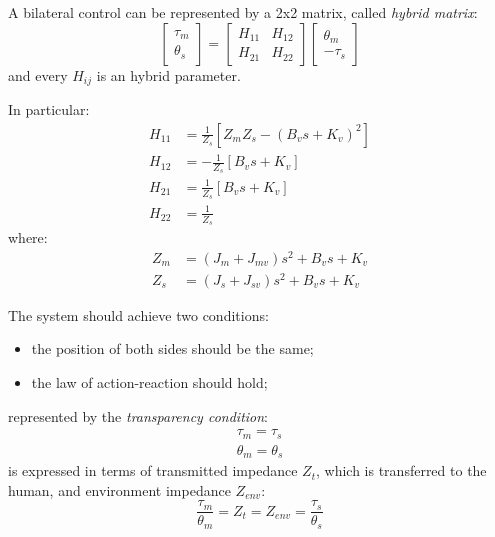 A bilateral control can be represented by a 2x2 matrix, called \emph{hybrid matrix}:
\begin{equation}
	\begin{bmatrix}
	\tau_m \\ \theta_s
	\end{bmatrix} = 
	\begin{bmatrix}
	H_{11} & H_{12} \\
	H_{21} & H_{22}
	\end{bmatrix}
	\begin{bmatrix}
	\theta_m \\ - \tau_s
	\end{bmatrix}
	\label{hybrid_matrix}
\end{equation}
and every $ H_{ij} $ is an hybrid parameter.

In particular:
\begin{align}
	H_{11} &= \frac{1}{Z_s}[Z_m Z_s - (B_v s + K_v)^2] \\
	H_{12} &= -\frac{1}{Z_s}[B_v s + K_v] \\
	H_{21} &= \frac{1}{Z_s}[B_v s + K_v] \\
	H_{22} &= \frac{1}{Z_s} 
\end{align}
where:
\begin{align}
	Z_m &= (J_m + J_{mv}) s^2 + B_v s + K_v \\
	Z_s &= (J_s + J_{sv}) s^2 + B_v s + K_v
\end{align}

The system should achieve two conditions:
\begin{itemize}
	\item the position of both sides should be the same;
	\item the law of action-reaction should hold;
\end{itemize}
represented by the \emph{transparency condition}:
\begin{align}
	\tau_m = \tau_s \\
	\theta_m = \theta_s
	\label{transparencY_condition}
\end{align}
is expressed in terms of transmitted impedance $ Z_t $, which is transferred to the human, and environment impedance $ Z_{env} $:
\begin{equation}
	\frac{\tau_m}{\theta_m} = Z_t = Z_{env} = \frac{\tau_s}{\theta_s}
\end{equation}

